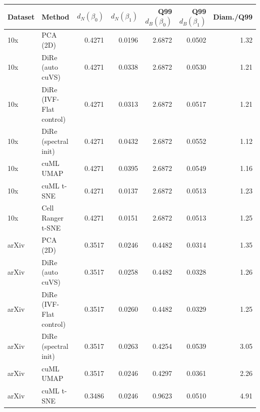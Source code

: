 \begin{tabular}{@{}llrrrrr@{}}
\toprule
Dataset & Method & $d_N(\beta_0)$ & $d_N(\beta_1)$ & Q99 $d_B(\beta_0)$ & Q99 $d_B(\beta_1)$ & Diam./Q99 \\
\midrule
10x & PCA (2D) & 0.4271 & 0.0196 & 2.6872 & 0.0502 & 1.32 \\
10x & DiRe (auto cuVS) & 0.4271 & 0.0338 & 2.6872 & 0.0530 & 1.21 \\
10x & DiRe (IVF-Flat control) & 0.4271 & 0.0313 & 2.6872 & 0.0517 & 1.21 \\
10x & DiRe (spectral init) & 0.4271 & 0.0432 & 2.6872 & 0.0552 & 1.12 \\
10x & cuML UMAP & 0.4271 & 0.0395 & 2.6872 & 0.0549 & 1.16 \\
10x & cuML t-SNE & 0.4271 & 0.0137 & 2.6872 & 0.0513 & 1.23 \\
10x & Cell Ranger t-SNE & 0.4271 & 0.0151 & 2.6872 & 0.0513 & 1.25 \\
\addlinespace
arXiv & PCA (2D) & 0.3517 & 0.0246 & 0.4482 & 0.0314 & 1.35 \\
arXiv & DiRe (auto cuVS) & 0.3517 & 0.0258 & 0.4482 & 0.0328 & 1.26 \\
arXiv & DiRe (IVF-Flat control) & 0.3517 & 0.0260 & 0.4482 & 0.0329 & 1.25 \\
arXiv & DiRe (spectral init) & 0.3517 & 0.0263 & 0.4254 & 0.0539 & 3.05 \\
arXiv & cuML UMAP & 0.3517 & 0.0246 & 0.4297 & 0.0361 & 2.26 \\
arXiv & cuML t-SNE & 0.3486 & 0.0246 & 0.9623 & 0.0510 & 4.91 \\
\bottomrule
\end{tabular}
